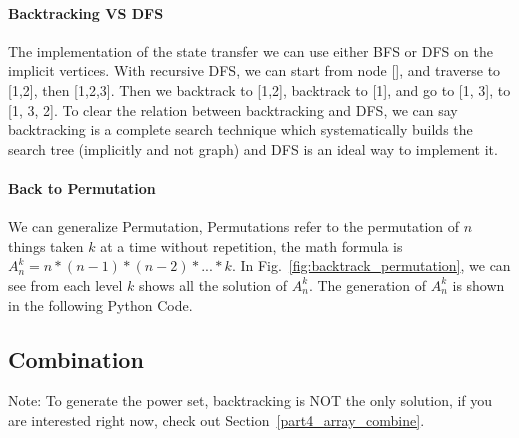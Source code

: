 \documentclass[../main.tex]{subfiles}
\begin{document}
\paragraph{Backtracking VS DFS} The implementation of the state transfer we can use either BFS or DFS on the implicit vertices.  With recursive DFS, we can start from node [], and traverse to [1,2], then [1,2,3]. Then we backtrack to [1,2], backtrack to [1], and go to [1, 3], to [1, 3, 2].  To clear the relation between backtracking and DFS, we can say backtracking is a complete search technique which systematically builds the search tree (implicitly and not graph) and DFS is an ideal way to implement it. 


\paragraph{Back to Permutation}
We can generalize Permutation, Permutations refer to the permutation of $n$ things taken $k$ at a time without repetition, the math formula is $A_{n}^{k} = n *(n-1)*(n-2)*...*k$. In Fig.~\ref{fig:backtrack_permutation}, we can see from each level $k$ shows all the solution of $A_{n}^{k}$. The generation of  $A_{n}^{k}$ is shown in the following Python Code.%





 








\subsection{Combination}
\label{sec_combination}



Note: To generate the power set, backtracking is NOT the only solution, if you are interested right now, check out Section~\ref{part4_array_combine}.
\end{document}
